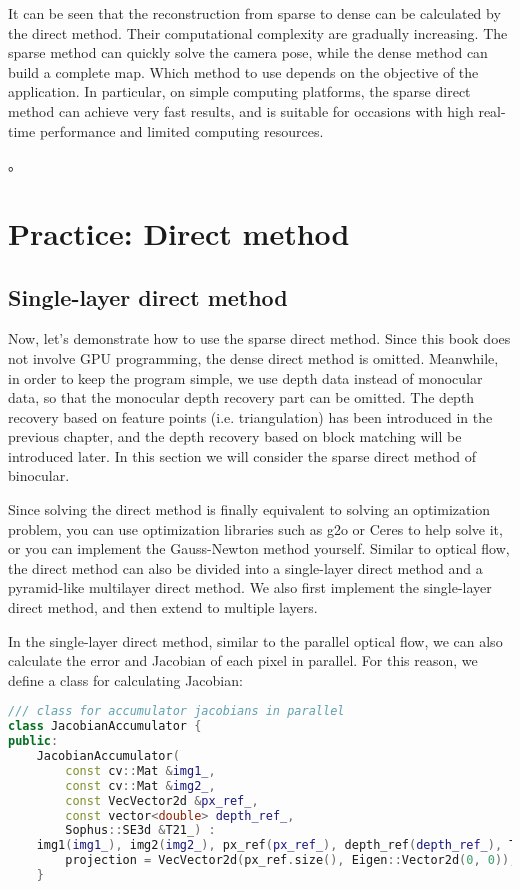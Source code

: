 {It can be seen that the reconstruction from sparse to dense can be calculated by the direct method. Their computational complexity are gradually increasing. The sparse method can quickly solve the camera pose, while the dense method can build a complete map. Which method to use depends on the objective of the application. In particular, on simple computing platforms, the sparse direct method can achieve very fast results, and is suitable for occasions with high real-time performance and limited computing resources.

\textsuperscript{\cite{Engel2016}}。

\section{Practice: Direct method}
\subsection{Single-layer direct method}
Now, let's demonstrate how to use the sparse direct method. Since this book does not involve GPU programming, the dense direct method is omitted. Meanwhile, in order to keep the program simple, we use depth data instead of monocular data, so that the monocular depth recovery part can be omitted. The depth recovery based on feature points (i.e. triangulation) has been introduced in the previous chapter, and the depth recovery based on block matching will be introduced later. In this section we will consider the sparse direct method of binocular.

Since solving the direct method is finally equivalent to solving an optimization problem, you can use optimization libraries such as g2o or Ceres to help solve it, or you can implement the Gauss-Newton method yourself. Similar to optical flow, the direct method can also be divided into a single-layer direct method and a pyramid-like multilayer direct method. We also first implement the single-layer direct method, and then extend to multiple layers.

In the single-layer direct method, similar to the parallel optical flow, we can also calculate the error and Jacobian of each pixel in parallel. For this reason, we define a class for calculating Jacobian:

\begin{lstlisting}[language=c++,caption=slambook2/ch8/direct_method.cpp（片段）]
/// class for accumulator jacobians in parallel
class JacobianAccumulator {
public:
	JacobianAccumulator(
		const cv::Mat &img1_,
		const cv::Mat &img2_,
		const VecVector2d &px_ref_,
		const vector<double> depth_ref_,
		Sophus::SE3d &T21_) :
	img1(img1_), img2(img2_), px_ref(px_ref_), depth_ref(depth_ref_), T21(T21_) {
		projection = VecVector2d(px_ref.size(), Eigen::Vector2d(0, 0));
	}
	

\end{lstlisting}}
